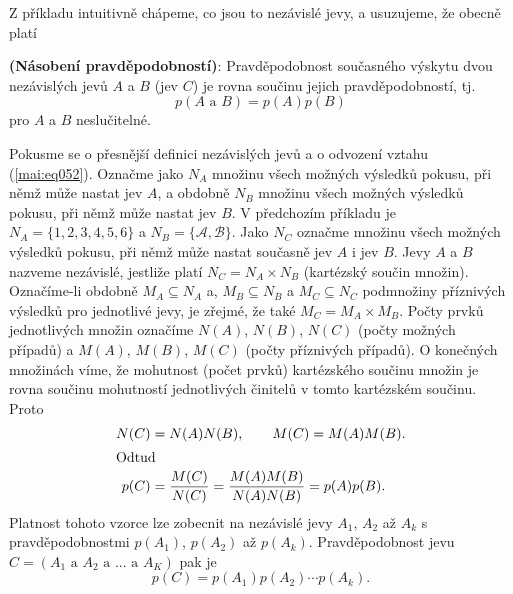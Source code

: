       Z příkladu intuitivně chápeme, co jsou to nezávislé jevy, a usuzujeme, že obecně platí
      \begin{mdframed}[style=mdmathdef]
        \begin{lemma}\label{mai:lemma003}
          \textbf{(Násobení pravděpodobností)}: Pravděpodobnost současného výskytu dvou nezávislých 
          jevů \(A\) a \(B\) (jev \(C\)) je rovna součinu jejich pravděpodobností, tj.
          \begin{equation}\label{mai:eq052}
            p(A \text{ a } B)= p(A)p(B) 
          \end{equation}
          pro \(A\) a \(B\) neslučitelné.
        \end{lemma}
      \end{mdframed}
      
      Pokusme se o přesnější definici nezávislých jevů a o odvození vztahu (\ref{mai:eq052}). 
      Označme jako \(N_A\) množinu všech možných výsledků pokusu, při němž může nastat jev \(A\), a 
      obdobně \(N_B\) množinu všech možných výsledků pokusu, při němž může nastat jev \(B\). V 
      předchozím příkladu je \(N_A = \{1, 2, 3, 4, 5, 6\}\) a \(N_B = \{\mathcal{A}, 
      \mathcal{B}\}\). Jako \(N_C\) označme množinu všech možných výsledků pokusu, při němž může 
      nastat současně jev \(A\) i jev \(B\). Jevy \(A\) a \(B\) nazveme nezávislé, jestliže
      platí \(N_C = N_A \times N_B\) (kartézský součin množin). Označíme-li obdobně \(M_A \subseteq 
      N_A\) a, \(M_B \subseteq N_B\) a \(M_C \subseteq N_C\) podmnožiny příznivých výsledků pro 
      jednotlivé jevy, je zřejmé, že také \(M_C = M_A \times M_B\). Počty prvků jednotlivých množin 
      označíme \(N(A)\), \(N(B)\), \(N(C)\) (počty možných případů) a \(M(A)\), \(M(B)\), \(M(C)\) 
      (počty příznivých případů). O konečných množinách víme, že mohutnost (počet prvků) 
      kartézského součinu množin je rovna součinu mohutností jednotlivých
      činitelů v tomto kartézském součinu. Proto
      \begin{align*}
        N(C) &= N(A)N(B),\qquad M(C) = M(A)M(B). \\
        \shortintertext{Odtud}
        p(C) &= \dfrac{M(C)}{N(C)} = \dfrac{M(A)M(B)}{N(A)N(B)} = p(A)p(B).
      \end{align*}
      Platnost tohoto vzorce lze zobecnit na nezávislé jevy \(A_1\), \(A_2\) až \(A_k\) s 
      pravděpodobnostmi \(p(A_1)\), \(p(A_2)\) až \(p(A_k)\). Pravděpodobnost jevu \(C = (A_1\text{ 
      a }A_2\text{ a }...\text{ a }A_K)\) pak je
      \begin{equation*}
        p(C) = p(A_1)p(A_2)\cdots p(A_k).
      \end{equation*}
 
